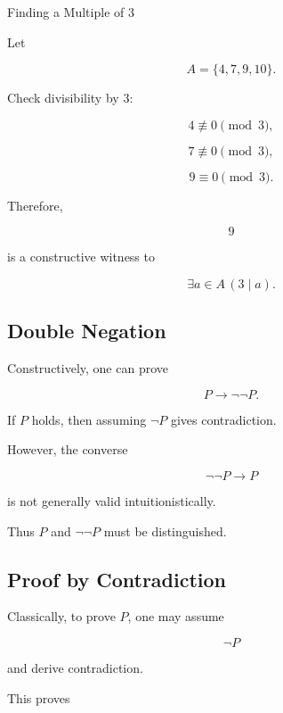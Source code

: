 \begin{workedexamplebox}{Finding a Multiple of \(3\)}

Let

\[
A=\{4,7,9,10\}.
\]

Check divisibility by \(3\):

\[
4\not\equiv0\pmod3,
\]

\[
7\not\equiv0\pmod3,
\]

\[
9\equiv0\pmod3.
\]

Therefore,

\begin{answerbox}
\[
\boxed{
9
}
\]

is a constructive witness to

\[
\exists a\in A
\,
(3\mid a).
\]
\end{answerbox}

\end{workedexamplebox}

\subsection{Double Negation}
\label{subsec:constructive-double-negation}

Constructively, one can prove

\[
\boxed{
P
\rightarrow
\neg\neg P.
}
\]

If \(P\) holds, then assuming \(\neg P\) gives contradiction.

However, the converse

\[
\boxed{
\neg\neg P
\rightarrow
P
}
\]

is not generally valid intuitionistically.

Thus \(P\) and \(\neg\neg P\) must be distinguished.

\subsection{Proof by Contradiction}
\label{subsec:constructive-proof-by-contradiction}

Classically, to prove \(P\), one may assume

\[
\neg P
\]

and derive contradiction.

This proves

